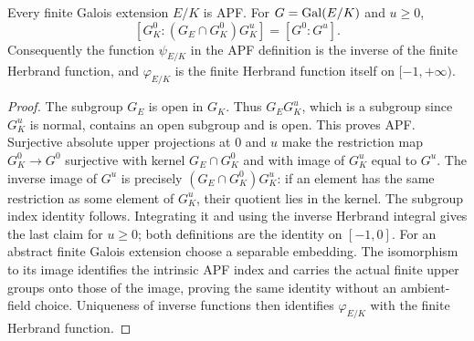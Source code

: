 \begin{proposition}
\label{fw:finite-apf-indices}
\leanok
Every finite Galois extension $E/K$ is APF. For $G=\operatorname{Gal}(E/K)$ and
$u\geq0$,
\[
 [G_K^0:(G_E\cap G_K^0)G_K^u]=[G^0:G^u].
\]
Consequently the function $\psi_{E/K}$ in the APF definition is the
inverse of the finite Herbrand function, and $\varphi_{E/K}$ is the
finite Herbrand function itself on $[-1,+\infty)$.
\end{proposition}
\begin{proof}
The subgroup $G_E$ is open in $G_K$. Thus $G_EG_K^u$, which is a
subgroup since $G_K^u$ is normal, contains an open subgroup and is open.
This proves APF. Surjective absolute upper projections at $0$ and $u$
make the restriction map $G_K^0\to G^0$ surjective with kernel
$G_E\cap G_K^0$ and with image of $G_K^u$ equal to $G^u$.
The inverse image of $G^u$ is precisely $(G_E\cap G_K^0)G_K^u$:
if an element has the same restriction as some element of $G_K^u$,
their quotient lies in the kernel. The subgroup index identity follows.
Integrating it and using the inverse Herbrand integral gives the last
claim for $u\geq0$; both definitions are the identity on $[-1,0]$.
For an abstract finite Galois extension choose a separable embedding.
The isomorphism to its image identifies the intrinsic APF index and
carries the actual finite upper groups onto those of the image, proving
the same identity without an ambient-field choice. Uniqueness of inverse
functions then identifies $\varphi_{E/K}$ with the finite Herbrand function.
\end{proof}

